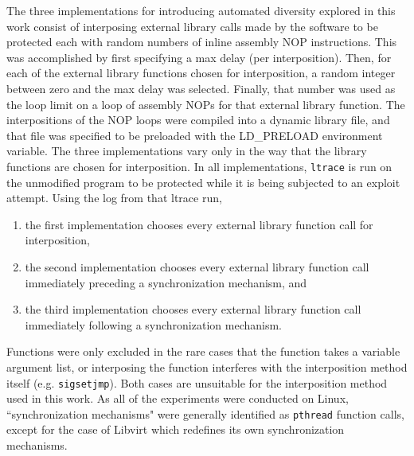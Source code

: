 The three implementations for introducing automated diversity explored in this work consist of interposing external library calls \cite{Conrad2009} made by the software to be protected each with random numbers of inline assembly NOP instructions.
This was accomplished by first specifying a max delay (per interposition).
Then, for each of the external library functions chosen for interposition, a random integer between zero and the max delay was selected.
Finally, that number was used as the loop limit on a loop of assembly NOPs for that external library function.
The interpositions of the NOP loops were compiled into a dynamic library file, and that file was specified to be preloaded with the LD\_PRELOAD environment variable.
The three implementations vary only in the way that the library functions are chosen for interposition.
In all implementations, \texttt{ltrace} \cite{cespedesltrace} is run on the unmodified program to be protected while it is being subjected to an exploit attempt.
Using the log from that ltrace run,
\begin{enumerate}
	\item the first implementation chooses every external library function call for interposition,
	\item the second implementation chooses every external library function call immediately preceding a synchronization mechanism, and
	\item the third implementation chooses every external library function call immediately following a synchronization mechanism.
\end{enumerate}
Functions were only excluded in the rare cases that the function takes a variable argument list, or interposing the function interferes with the interposition method itself (e.g. \texttt{sigsetjmp}).
Both cases are unsuitable for the interposition method used in this work.
As all of the experiments were conducted on Linux, ``synchronization mechanisms" were generally identified as \texttt{pthread} function calls, except for the case of Libvirt which redefines its own synchronization mechanisms.